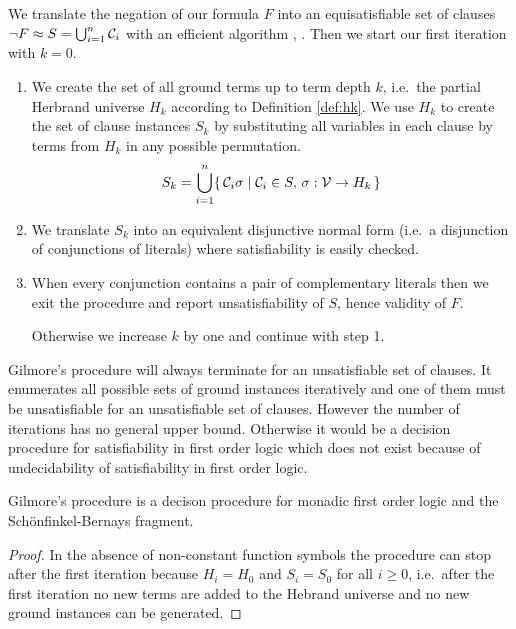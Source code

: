 \begin{procedure}\label{proc:gilmore's:prover}
	We translate the negation of our formula $F$ into an equisatisfiable set of clauses 
	$\lnot F \approx S = \bigcup_{i=1}^{n} {\mathcal C}_i$ with an efficient algorithm \cite{tseitin70}, \cite{PLAISTED1986293}.
	Then we start our first iteration with $k=0$.
	\begin{enumerate}
		
		\item We create the set of all ground terms up to term depth $k$, 
		i.e.~the partial Herbrand universe $H_k$ according to Definition \ref{def:hk}. 
		We use $H_k$ to create the set of clause instances $S_k$ 
		by substituting all variables 
		in each clause by terms from $H_k$ in any possible permutation.
		\[ S_k = \bigcup_{i=1}^{n} 
		\{\,
			{\mathcal C}_i\sigma \mid {\mathcal C}_i \in S,\,\sigma: {\mathcal V}\to H_k
		\,\}
		\]
		
		\item We translate $S_k$ into an equivalent disjunctive normal form 
		(i.e.~a disjunction of conjunctions of literals)
		where satisfiability is easily checked.
		
		

		\item When every conjunction contains a pair of complementary literals 
		then we exit the procedure and report unsatisfiability of $S$, 
		hence validity of $F$.

Otherwise we increase $k$ by one and continue with step 1.
		
		
	\end{enumerate}
	
\end{procedure}

Gilmore's procedure will always terminate for an unsatisfiable set of clauses.
It enumerates all possible sets of ground instances iteratively
and one of them must be unsatisfiable for an unsatisfiable set of clauses. 
However the number of iterations has no general upper bound. 
Otherwise it would be a decision procedure for satisfiability in first order logic
which does not exist because of undecidability of satisfiability in first order logic.

\begin{lemma}
	Gilmore's procedure is a decison procedure for monadic first order logic and the Schönfinkel-Bernays fragment. 
\end{lemma}

\begin{proof}
	In the absence of non-constant function symbols 
	the procedure can stop after the first iteration because $H_i = H_0$ and $S_i = S_0$ for all $i\geq0$,
	i.e.~after the first iteration 
	no new terms are added to the Hebrand universe 
	and no new ground instances can be generated.
\end{proof}
%



